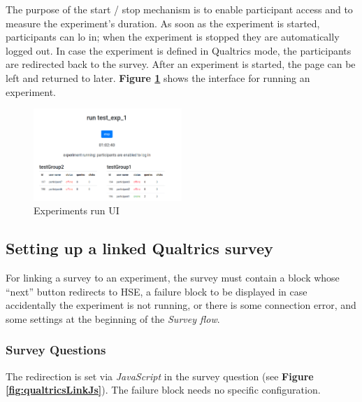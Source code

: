 \documentclass[a4paper]{usiinfbachelorproject}
\begin{document}
\begin{appendices}
        The purpose of the start / stop mechanism is to enable participant access and to measure the experiment's duration. As
        soon as the experiment is started, participants can lo in; when the experiment is stopped they are automatically logged out.
        In case the experiment is defined in Qualtrics mode, the participants are redirected back to the survey.
        After an experiment is started, the page can be left and returned to later.
        \textbf{Figure \ref{fig:expRunUi}} shows the interface for running an experiment.

        \begin{figure} [h]
        \centering
        \includegraphics[width=0.5\textwidth]{figures/expRunUi}
        \caption[]{Experiments run UI}
        \label{fig:expRunUi}
        \end{figure}

        \subsection{Setting up a linked Qualtrics survey}\label{sec:usageSurvey}

        For linking a survey to an experiment, the survey must contain
        a block whose ``next'' button redirects to HSE, a failure block to be displayed in case accidentally the experiment is not running, or
        there is some connection error,
        and some settings at the beginning of the \emph{Survey flow}. 

        \subsubsection{Survey Questions}

        The redirection is set via \emph{JavaScript} in the survey question (see
        \textbf{Figure \ref{fig:qualtricsLinkJs}}). The failure block needs no specific configuration.


\end{appendices}
\end{document}
